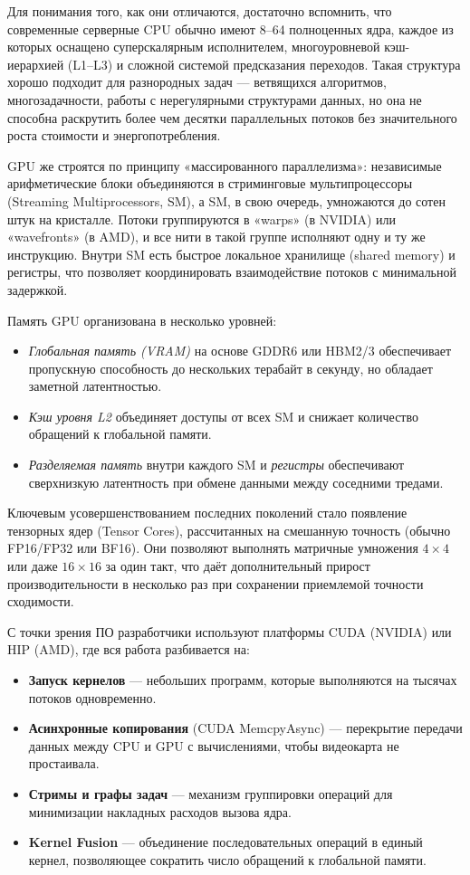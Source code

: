 Для понимания того, как они отличаются, достаточно вспомнить, что современные серверные CPU обычно имеют 8–64 полноценных ядра, каждое из которых оснащено суперскалярным исполнителем, многоуровневой кэш-иерархией (L1–L3) и сложной системой предсказания переходов. Такая структура хорошо подходит для разнородных задач — ветвящихся алгоритмов, многозадачности, работы с нерегулярными структурами данных, но она не способна раскрутить более чем десятки параллельных потоков без значительного роста стоимости и энергопотребления.  

GPU же строятся по принципу «массированного параллелизма»: независимые арифметические блоки объединяются в стриминговые мультипроцессоры (Streaming Multiprocessors, SM), а SM, в свою очередь, умножаются до сотен штук на кристалле. Потоки группируются в «warps» (в NVIDIA) или «wavefronts» (в AMD), и все нити в такой группе исполняют одну и ту же инструкцию. Внутри SM есть быстрое локальное хранилище (shared memory) и регистры, что позволяет координировать взаимодействие потоков с минимальной задержкой.  

Память GPU организована в несколько уровней:  
\begin{itemize}  
  \item \emph{Глобальная память (VRAM)} на основе GDDR6 или HBM2/3 обеспечивает пропускную способность до нескольких терабайт в секунду, но обладает заметной латентностью.  
  \item \emph{Кэш уровня L2} объединяет доступы от всех SM и снижает количество обращений к глобальной памяти.  
  \item \emph{Разделяемая память} внутри каждого SM и \emph{регистры} обеспечивают сверхнизкую латентность при обмене данными между соседними тредами.  
\end{itemize}  

Ключевым усовершенствованием последних поколений стало появление тензорных ядер (Tensor Cores), рассчитанных на смешанную точность (обычно FP16/FP32 или BF16). Они позволяют выполнять матричные умножения $4\times4$ или даже $16\times16$ за один такт, что даёт дополнительный прирост производительности в несколько раз при сохранении приемлемой точности сходимости.  

С точки зрения ПО разработчики используют платформы CUDA (NVIDIA) или HIP (AMD), где вся работа разбивается на:  
\begin{itemize}  
  \item \textbf{Запуск кернелов} — небольших программ, которые выполняются на тысячах потоков одновременно.  
  \item \textbf{Асинхронные копирования} (CUDA MemcpyAsync) — перекрытие передачи данных между CPU и GPU с вычислениями, чтобы видеокарта не простаивала.  
  \item \textbf{Стримы и графы задач} — механизм группировки операций для минимизации накладных расходов вызова ядра.  
  \item \textbf{Kernel Fusion} — объединение последовательных операций в единый кернел, позволяющее сократить число обращений к глобальной памяти.  
\end{itemize}  

